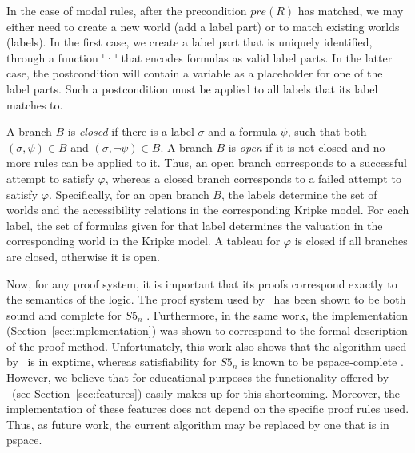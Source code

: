 In the case of modal rules, after the precondition $pre(R)$ has matched, we
may either need to create a new world (add a label part) or to match existing
worlds (labels). In the first case, we create a label part that is uniquely
identified, through a function $\ulcorner\cdot\urcorner$ that encodes formulas as valid
label parts. In the latter case, the postcondition will contain a variable as
a placeholder for one of the label parts. Such a postcondition must be applied
to all labels that its label matches to.

A branch $B$ is {\em closed} if there is a label $\sigma$ and a formula
$\psi$, such that both $(\sigma, \psi) \in B$ and $(\sigma, \neg \psi)
\in B$. A branch $B$ is {\em open} if it is not closed and no more rules can be
applied to it. Thus, an open branch corresponds to a successful attempt to
satisfy $\varphi$, whereas a closed branch corresponds to a failed attempt to
satisfy $\varphi$. 
Specifically, for an open branch $B$, the labels determine the set of worlds
and the accessibility relations in the corresponding Kripke model. For each
label, the set of formulas given for that label determines the valuation in the
corresponding world in the Kripke model.
A tableau for $\varphi$ is closed if all branches are
closed, otherwise it is open. 



Now, for any proof system, it is important that its proofs correspond exactly
to the semantics of the logic.
The proof system used by \oops\ has been shown to be both sound and complete
for $S5_n$ \citep{valkenhoef2008}. 
Furthermore, in the same work, the implementation
(Section~\ref{sec:implementation}) was
shown to correspond to the formal description of the proof method.
Unfortunately, this work also shows that the algorithm used by \oops\ is in
{\sc exptime}, whereas satisfiability for $S5_n$ is known to be {\sc pspace}-complete \citep{halpern1992}.
However, we believe that for educational purposes the functionality  offered
by \oops\ (see Section~\ref{sec:features}) easily makes up for this
shortcoming. Moreover, the implementation of these features does not depend on
the specific proof rules used. Thus, as future work, the current algorithm may
be replaced by one that is in {\sc pspace}.




